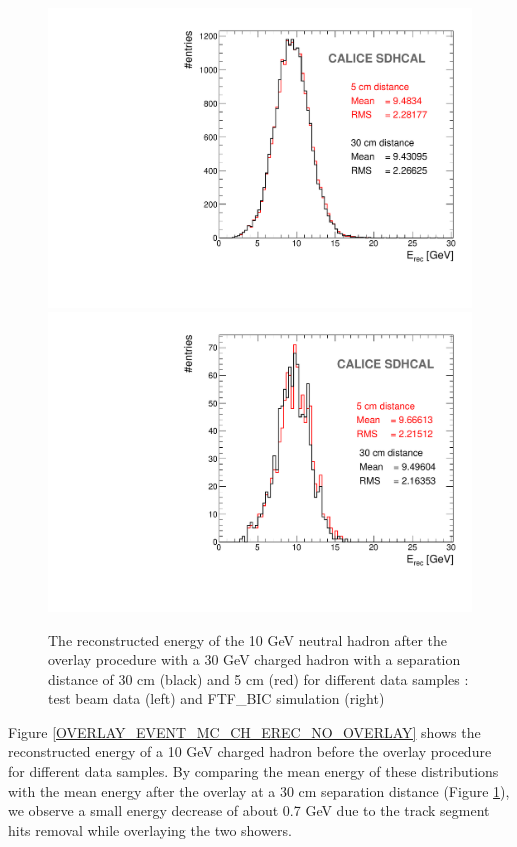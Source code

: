 \documentclass[cits]{JINST}
\begin{document}
\begin{figure}[!h]
  \begin{center}
    \includegraphics[width=0.48\linewidth]{plots/OverlayEvent/OverlayEvent_OverlayCheck_TB.pdf}
    \includegraphics[width=0.48\linewidth]{plots/OverlayEvent/OverlayEvent_OverlayCheck_FTF_BIC.pdf}
  \end{center}
  \caption{\label{OVERLAY_EVENT_MC_EREC_OVERLAID_HITS} The reconstructed energy of the 10 GeV neutral hadron after the overlay procedure with a 30 GeV charged hadron with a separation distance of 30 cm (black) and 5 cm (red) for different data samples : test beam data (left) and FTF\_BIC simulation (right)}
\end{figure}

Figure \ref{OVERLAY_EVENT_MC_CH_EREC_NO_OVERLAY} shows the reconstructed energy of a 10 GeV charged hadron before the overlay procedure for different data samples. By comparing the mean energy of these distributions with the mean energy after the overlay at a 30 cm separation distance (Figure \ref{OVERLAY_EVENT_MC_EREC_OVERLAID_HITS}), we observe a small energy decrease of about 0.7 GeV due to the track segment hits removal while overlaying the two showers.

\end{document}
